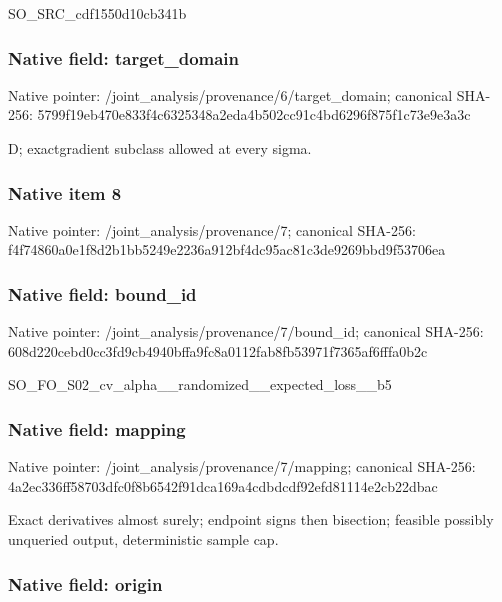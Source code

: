 \documentclass[10pt,a4paper]{article}
\begin{document}
SO\_SRC\_cdf1550d10cb341b


\subsubsection{Native field: target\_domain}


Native pointer: /joint\_analysis/provenan\allowbreak{}ce/6/target\_domain; canonical SHA-256: 5799f19eb470e833f4c63253\allowbreak{}48a2eda4b502cc91c4bd6296\allowbreak{}f875f1c73e9e3a3c


D; exactgradient subclass allowed at every sigma.


\subsubsection{Native item 8}


Native pointer: /joint\_analysis/provenance/7; canonical SHA-256: f4f74860a0e1f8d2b1bb5249\allowbreak{}e2236a912bf4dc95ac81c3de\allowbreak{}9269bbd9f53706ea



\subsubsection{Native field: bound\_id}


Native pointer: /joint\_analysis/provenance/7/bound\_id; canonical SHA-256: 608d220cebd0cc3fd9cb4940\allowbreak{}bffa9fc8a0112fab8fb53971\allowbreak{}f7365af6fffa0b2c


SO\_FO\_S02\_cv\_alpha\_\_rand\allowbreak{}omized\_\_expected\_loss\_\_b\allowbreak{}5


\subsubsection{Native field: mapping}


Native pointer: /joint\_analysis/provenance/7/mapping; canonical SHA-256: 4a2ec336ff58703dfc0f8b65\allowbreak{}42f91dca169a4cdbdcdf92ef\allowbreak{}d81114e2cb22dbac


Exact derivatives almost surely; endpoint signs then bisection; feasible possibly unqueried output, deterministic sample cap.


\subsubsection{Native field: origin}
\end{document}
